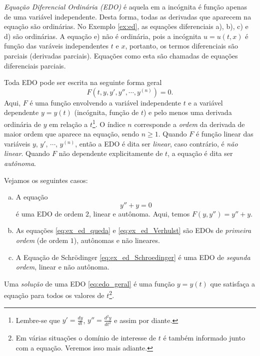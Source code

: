 \emph{Equação Diferencial Ordinária (EDO)} é aquela em a incógnita é função apenas de uma variável independente. Desta forma, todas as derivadas que aparecem na equação são ordinárias. No Exemplo \ref{ex:ed}, as equações diferenciais a), b), c) e d) são ordinárias. A equação e) não é ordinária, pois a incógnita $u = u(t,x)$ é função das varáveis independentes $t$ e $x$, portanto, os termos diferenciais são parciais (derivadas parciais). Equações como esta são chamadas de equações diferenciais parciais.

Toda EDO pode ser escrita na seguinte forma geral
\begin{equation}\label{eq:edo_geral}
  F(t, y, y', y'', \cdots, y^{(n)}) = 0.
\end{equation}
Aqui, $F$ é uma função envolvendo a variável independente $t$ e a variável dependente $y = y(t)$ (incógnita, função de $t$) e pelo menos uma derivada ordinária de $y$ em relação a $t$\footnote{Lembre-se que $\displaystyle y' = \frac{dy}{dt}$, $y'' = \frac{d^2y}{dt^2}$ e assim por diante.}. O índice $n$ corresponde a \emph{ordem} da derivada de maior ordem que aparece na equação, sendo $n\geq 1$. Quando $F$ é função linear das variáveis $y$, $y'$, $\cdots$, $y^{(n)}$, então a EDO é dita ser \emph{linear}, caso contrário, é \emph{não linear}. Quando $F$ não dependente explicitamente de $t$, a equação é dita ser \emph{autônoma}.

\begin{ex}
  Vejamos os seguintes casos:
  \begin{enumerate}[a)]
  \item A equação
    \begin{equation}
      y'' + y = 0
    \end{equation}
    é uma EDO de ordem $2$, linear e autônoma. Aqui, temos $F(y, y'') = y'' + y$.
  \item As equações \eqref{eq:ex_ed_queda} e \eqref{eq:ex_ed_Verhulst} são EDOs de \emph{primeira ordem} (de ordem $1$), autônomas e não lineares.
  \item A Equação de Schrödinger \eqref{eq:ex_ed_Schroedinger} é uma EDO de \emph{segunda ordem}, linear e não autônoma.
  \end{enumerate}
\end{ex}

Uma \emph{solução} de uma EDO \eqref{eq:edo_geral} é uma função $y = y(t)$ que satisfaça a equação para todos os valores de $t$\footnote{Em várias situações o domínio de interesse de $t$ é também informado junto com a equação. Veremos isso mais adiante.}.

